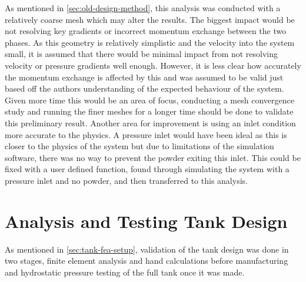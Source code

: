 As mentioned in \autoref{sec:old-design-method}, this analysis was conducted with a relatively coarse mesh which may alter the results. The biggest impact would be not resolving key gradients or incorrect momentum exchange between the two phases. As this geometry is relatively simplistic and the velocity into the system small, it is assumed that there would be minimal impact from not resolving velocity or pressure gradients well enough. However, it is less clear how accurately the momentum exchange is affected by this and was assumed to be valid just based off the authors understanding of the expected behaviour of the system. Given more time this would be an area of focus, conducting a mesh convergence study and running the finer meshes for a longer time should be done to validate this preliminary result. Another area for improvement is using an inlet condition more accurate to the physics. A pressure inlet would have been ideal as this is closer to the physics of the system but due to limitations of the simulation software, there was no way to prevent the powder exiting this inlet. This could be fixed with a user defined function, found through simulating the system with a pressure inlet and no powder, and then transferred to this analysis.

\section{Analysis and Testing Tank Design}\label{sec:pressure-testing}
As mentioned in \autoref{sec:tank-fea-setup}, validation of the tank design was done in two stages, finite element analysis and hand calculations before manufacturing and hydrostatic pressure testing of the full tank once it was made.

